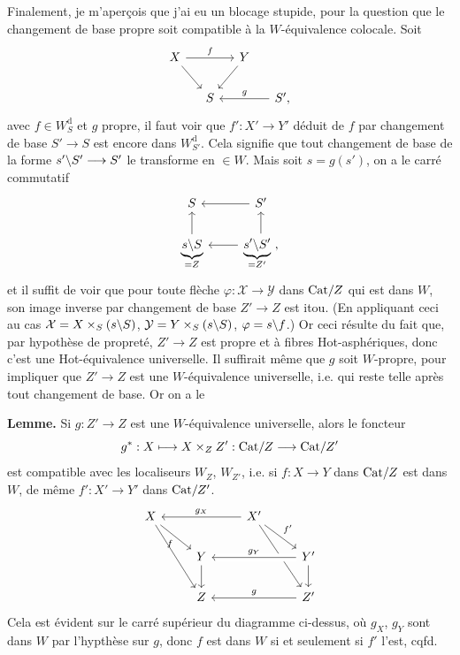 \noindent{}%
Finalement, je m'aperçois que j'ai eu un blocage stupide, pour la question que le changement de base propre soit compatible à la $W$-équivalence colocale. Soit
\[
\begin{tikzcd}[column sep=small]
X \arrow[rr, "f"] \arrow[dr] & & Y \arrow[dl] & \\
& S & & S', \arrow[ll, "g"']
\end{tikzcd}
\]
avec $f \in W^{\mathrm{d}}_{S}$ et $g$ propre, il faut voir que $f' : X' \longrightarrow Y'$ déduit de $f$ par changement de base $S' \longrightarrow S$ est encore dans $W^{\mathrm{d}}_{S'}$. Cela signifie que tout changement de base de la forme $s'\backslash S' \longrightarrow S'$ le transforme en $\in W$. Mais soit $s = g(s')$, on a le carré commutatif
\[
\begin{tikzcd}
S & S' \arrow[l] \\
\underbrace{s\bs S}_{= Z} \arrow[u] & \underbrace{s'\bs S'}_{= Z'} \arrow[l] \arrow[u] \ ,
\end{tikzcd}
\]
et il suffit de voir que pour toute flèche $\varphi : \mathcal{X} \longrightarrow \mathcal{Y}$ dans $\mathrm{Cat}/Z$ qui est dans $W$, son image inverse par changement de base $Z' \longrightarrow Z$ est itou. (En appliquant ceci au cas $\mathcal{X} = X \times_S (s\backslash S)$, $\mathcal{Y} = Y \times_S (s\backslash S)$, $\varphi = s\backslash f$.) Or ceci résulte du fait que, par hypothèse de propreté, $Z' \longrightarrow Z$ est propre et à fibres Hot-asphériques, donc c'est une Hot-équivalence universelle. Il suffirait même que $g$ soit $W$-propre, pour impliquer que $Z' \longrightarrow Z$ est une $W$-équivalence universelle, i.e. qui reste telle après tout changement de base. Or on a le

\noindent\textbf{Lemme.} Si $g : Z' \longrightarrow Z$ est une $W$-équivalence universelle, alors le foncteur
\[
g^* : X \longmapsto X \times_Z Z' : \mathrm{Cat}/Z \longrightarrow \mathrm{Cat}/Z'
\]
est compatible avec les localiseurs $W_Z$, $W_{Z'}$, i.e. si $f : X \longrightarrow Y$ dans $\mathrm{Cat}/Z$ est dans $W$, de même $f' : X' \longrightarrow Y'$ dans $\mathrm{Cat}/Z'$.
\[
\begin{tikzcd}
X \arrow[dr, "f"'] \arrow[ddr] & & X' \arrow[ll, "g_X"'] \arrow[dr, "f'"] \arrow[ddr] & \\
& Y \arrow[d] & & Y' \arrow[ll, "g_Y"', crossing over] \arrow[d] \\
& Z & & Z' \arrow[ll, "g"']
\end{tikzcd}
\]
Cela est évident sur le carré supérieur du diagramme ci-dessus, où $g_X$, $g_Y$ sont dans $W$ par l'hypthèse sur $g$, donc $f$ est dans $W$ si et seulement si $f'$ l'est, cqfd. %

